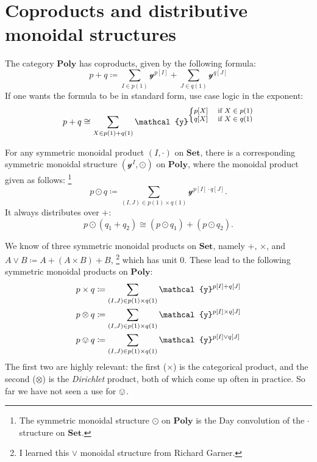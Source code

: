 \documentclass[11pt, one side, article]{memoir}
\theoremstyle{definition}
\theoremstyle{plain}
\newcommand{\Cat}[1]{\mathbf{#1}}%
\newcommand{\tn}[1]{\textnormal{#1}}
\newcommand{\smset}{\Cat{Set}}
\newcommand{\yon}{\mathcal{y}}
\newcommand{\poly}{\Cat{Poly}}
\newcommand{\0}{\textsf{0}}
\newcommand{\1}{\tn{\textsf{1}}}
\begin{document}
\chapter{Coproducts and distributive monoidal structures}

The category $\poly$ has coproducts, given by the following formula:
\begin{equation}
p+q\coloneqq\sum_{I\in p(1)}\yon^{p[I]}+\sum_{J\in q(1)}\yon^{q[J]}
\end{equation}
If one wants the formula to be in standard form, use case logic in the exponent:
\begin{equation}
p+q\cong\sum_{X\in p(1)+q(1)}\yon^{\fontsize{8pt}{8pt}\selectfont
	\begin{cases}
  	p[X]&\tn{ if }X\in p(1)\\
  	q[X]&\tn{ if }X\in q(1)
	\end{cases}\normalsize
	}
\end{equation}

For any symmetric monoidal product $(I,\cdot)$ on $\smset$, there is a corresponding symmetric monoidal structure $(\yon^I,\odot)$ on $\poly$, where the monoidal product given as follows:%
\footnote{The symmetric monoidal structure $\odot$ on $\poly$ is the Day convolution of the $\cdot$ structure on $\smset$.}
\begin{equation}
p\odot q\coloneqq\sum_{(I,J)\in p(1)\times q(1)}\yon^{p[I]\cdot q[J]}.
\end{equation}
It always distributes over $+$:
\begin{equation}
p\odot(q_1+q_2)\cong (p\odot q_1)+(p\odot q_2).
\end{equation}

We know of three symmetric monoidal products on $\smset$, namely $+$, $\times$, and $A\vee B\coloneqq A+(A\times B)+B$,%
\footnote{I learned this $\vee$ monoidal structure from Richard Garner.}
which has unit $0$. These lead to the following symmetric monoidal products on $\poly$:
\begin{align}
	p\times q&\coloneqq\sum_{(I,J)\in p(1)\times q(1)}\yon^{p[I]+ q[J]}\\
	p\otimes q&\coloneqq\sum_{(I,J)\in p(1)\times q(1)}\yon^{p[I]\times q[J]}\\
	p\ovee q&\coloneqq\sum_{(I,J)\in p(1)\times q(1)}\yon^{p[I]\vee q[J]}\label{eqn.ovee}
\end{align}
The first two are highly relevant: the first ($\times$) is the categorical product, and the second ($\otimes$) is the \emph{Dirichlet} product, both of which come up often in practice. So far we have not seen a use for $\ovee$.
\end{document}
